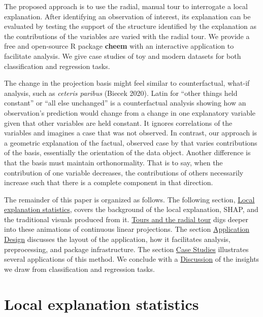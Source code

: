 \documentclass[
  article]{article}
\begin{document}
The proposed approach is to use the radial, manual tour to interrogate a local explanation. After identifying an observation of interest, its explanation can be evaluated by testing the support of the structure identified by the explanation as the contributions of the variables are varied with the radial tour. We provide a free and open-source R package \textbf{cheem} with an interactive application to facilitate analysis. We give case studies of toy and modern datasets for both classification and regression tasks.

The change in the projection basis might feel similar to counterfactual, what-if analysis, such as \emph{ceteris paribus} (Biecek 2020). Latin for ``other things held constant'' or ``all else unchanged'' is a counterfactual analysis showing how an observation's prediction would change from a change in one explanatory variable given that other variables are held constant. It ignores correlations of the variables and imagines a case that was not observed. In contrast, our approach is a geometric explanation of the factual, observed case by that varies contributions of the basis, essentially the orientation of the data object. Another difference is that the basis must maintain orthonormality. That is to say, when the contribution of one variable decreases, the contributions of others necessarily increase such that there is a complete component in that direction.

The remainder of this paper is organized as follows. The following section, \protect\hyperlink{sec:explanations}{Local explanation statistics}, covers the background of the local explanation, SHAP, and the traditional visuals produced from it. \protect\hyperlink{sec:tour}{Tours and the radial tour} digs deeper into these animations of continuous linear projections. The section \protect\hyperlink{sec:applicationdesign}{Application Design} discusses the layout of the application, how it facilitates analysis, preprocessing, and package infrastructure. The section \protect\hyperlink{sec:casestudies}{Case Studies} illustrates several applications of this method. We conclude with a \protect\hyperlink{sec:discussion}{Discussion} of the insights we draw from classification and regression tasks.

\hypertarget{sec:explanations}{%
\section{Local explanation statistics}\label{sec:explanations}}
\end{document}
